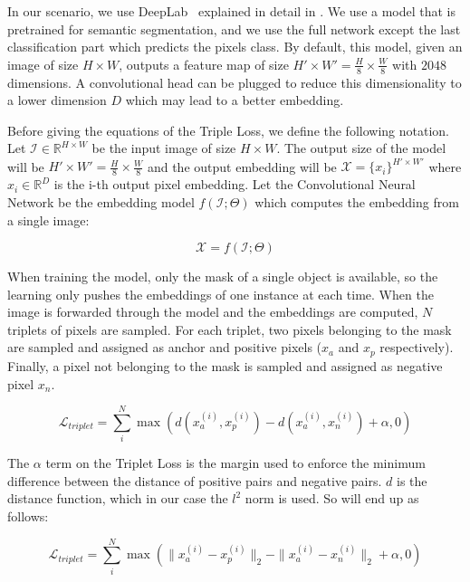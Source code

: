 In our scenario, we use DeepLab~\deeplab{} explained in detail in .
We use a model that is pretrained for semantic segmentation, and we use the full network except the last classification part which predicts the pixels class.
By default, this model, given an image of size $H \times W$, outputs a feature map of size $H' \times W' = \frac{H}{8} \times \frac{W}{8}$ with $2048$ dimensions.
A convolutional head can be plugged to reduce this dimensionality to a lower dimension $D$ which may lead to a better embedding.

Before giving the equations of the Triple Loss, we define the following notation.
Let $\mathcal{I} \in \mathbb{R}^{H \times W}$ be the input image of size $H \times W$.
The output size of the model will be $H' \times W' = \frac{H}{8} \times \frac{W}{8}$ and the output embedding will be $\mathcal{X} = \{x_i\}^{H' \times W'}$ where $x_i \in \mathbb{R}^D$ is the i-th output pixel embedding.
Let the Convolutional Neural Network be the embedding model $f(\mathcal{I}; \Theta)$ which computes the embedding from a single image:

\begin{equation}
  \mathcal{X} = f(\mathcal{I}; \Theta)
\end{equation}

When training the model,
only the mask of a single object is available,
so the learning only pushes the embeddings of one instance at each time.
When the image is forwarded through the model and the embeddings are computed, $N$ triplets of pixels are sampled.
For each triplet, two pixels belonging to the mask are sampled and assigned as anchor and positive pixels ($x_a$ and $x_p$ respectively).
Finally, a pixel not belonging to the mask is sampled and assigned as negative pixel $x_n$.

\begin{equation}
  \label{eq:tripletloss:1}
  \mathcal{L}_{triplet} = \sum_i^N \max \left( d(x_a^{(i)}, x_p^{(i)}) - d(x_a^{(i)}, x_n^{(i)})  + \alpha, 0 \right)
\end{equation}

The $\alpha$ term on the Triplet Loss is the margin used to enforce the minimum difference between the distance of positive pairs and negative pairs.
$d$ is the distance function, which in our case the $l^2$ norm is used.
So  will end up as follows:

\begin{equation}
  \label{eq:tripletloss:2}
  \mathcal{L}_{triplet} =
	\sum_i^N \max \left(
		\|x_a^{(i)} - x_p^{(i)}\|_2 - \|x_a^{(i)} - x_n^{(i)}\|_2  + \alpha,
		0 \right)
\end{equation}

